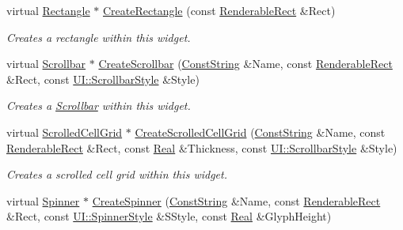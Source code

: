 \begin{DoxyCompactItemize}
virtual \hyperlink{classMezzanine_1_1UI_1_1Rectangle}{Rectangle} $\ast$ \hyperlink{classMezzanine_1_1UI_1_1RenderableContainerWidget_a0c80f0949dbfd82e2120e737158c70fc}{CreateRectangle} (const \hyperlink{structMezzanine_1_1UI_1_1RenderableRect}{RenderableRect} \&Rect)
\begin{DoxyCompactList}\small\item\em Creates a rectangle within this widget. \item\end{DoxyCompactList}\item 
virtual \hyperlink{classMezzanine_1_1UI_1_1Scrollbar}{Scrollbar} $\ast$ \hyperlink{classMezzanine_1_1UI_1_1RenderableContainerWidget_a15672e5bcb4d8ba8e5a1b083c90b0df8}{CreateScrollbar} (\hyperlink{namespaceMezzanine_a63cd699ac54b73953f35ec9cfc05e506}{ConstString} \&Name, const \hyperlink{structMezzanine_1_1UI_1_1RenderableRect}{RenderableRect} \&Rect, const \hyperlink{namespaceMezzanine_1_1UI_a5998a9bf372a7e92605c0c461736e763}{UI::ScrollbarStyle} \&Style)
\begin{DoxyCompactList}\small\item\em Creates a \hyperlink{classMezzanine_1_1UI_1_1Scrollbar}{Scrollbar} within this widget. \item\end{DoxyCompactList}\item 
virtual \hyperlink{classMezzanine_1_1UI_1_1ScrolledCellGrid}{ScrolledCellGrid} $\ast$ \hyperlink{classMezzanine_1_1UI_1_1RenderableContainerWidget_acd2c7557223fe1c4f070f59ecfaff53c}{CreateScrolledCellGrid} (\hyperlink{namespaceMezzanine_a63cd699ac54b73953f35ec9cfc05e506}{ConstString} \&Name, const \hyperlink{structMezzanine_1_1UI_1_1RenderableRect}{RenderableRect} \&Rect, const \hyperlink{namespaceMezzanine_a726731b1a7df72bf3583e4a97282c6f6}{Real} \&Thickness, const \hyperlink{namespaceMezzanine_1_1UI_a5998a9bf372a7e92605c0c461736e763}{UI::ScrollbarStyle} \&Style)
\begin{DoxyCompactList}\small\item\em Creates a scrolled cell grid within this widget. \item\end{DoxyCompactList}\item 
virtual \hyperlink{classMezzanine_1_1UI_1_1Spinner}{Spinner} $\ast$ \hyperlink{classMezzanine_1_1UI_1_1RenderableContainerWidget_a0afb9d45872dd11e1486ec6eb697fc94}{CreateSpinner} (\hyperlink{namespaceMezzanine_a63cd699ac54b73953f35ec9cfc05e506}{ConstString} \&Name, const \hyperlink{structMezzanine_1_1UI_1_1RenderableRect}{RenderableRect} \&Rect, const \hyperlink{namespaceMezzanine_1_1UI_a62462d4df783dcdda77e1590a96bc6d6}{UI::SpinnerStyle} \&SStyle, const \hyperlink{namespaceMezzanine_a726731b1a7df72bf3583e4a97282c6f6}{Real} \&GlyphHeight)

\end{DoxyCompactItemize}
